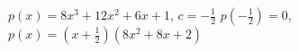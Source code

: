 {$p(x) = 8x^3+12x^2+6x+1$, $c =-\frac{1}{2}$}
{$p\left(-\frac{1}{2}\right) = 0$, $p(x)  = \left(x+\frac{1}{2}\right)\left(8x^2+8x+2\right)$}
